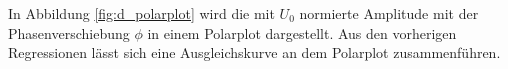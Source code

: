 In Abbildung \ref{fig:d_polarplot} wird die mit $U_0$ normierte Amplitude mit der Phasenverschiebung $\phi$ in einem Polarplot dargestellt.
Aus den vorherigen Regressionen lässt sich eine Ausgleichskurve an dem Polarplot zusammenführen.




